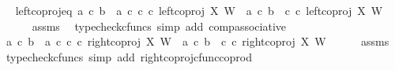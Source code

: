 \begin{isabellebody}
\ \isamarkupfalse%
\ left{\isacharunderscore}{\kern0pt}coproj{\isacharunderscore}{\kern0pt}eq{\isacharcolon}{\kern0pt}\ {\isachardoublequoteopen}{\isacharparenleft}{\kern0pt}{\isacharparenleft}{\kern0pt}a\ {\isasymcirc}\isactrlsub c\ b{\isacharparenright}{\kern0pt}\ {\isasymamalg}\ {\isacharparenleft}{\kern0pt}a\ {\isasymcirc}\isactrlsub c\ c{\isacharparenright}{\kern0pt}{\isacharparenright}{\kern0pt}\ {\isasymcirc}\isactrlsub c\ {\isacharparenleft}{\kern0pt}left{\isacharunderscore}{\kern0pt}coproj\ X\ W{\isacharparenright}{\kern0pt}\ {\isacharequal}{\kern0pt}\ {\isacharparenleft}{\kern0pt}a\ {\isasymcirc}\isactrlsub c\ {\isacharparenleft}{\kern0pt}b\ {\isasymamalg}\ c{\isacharparenright}{\kern0pt}{\isacharparenright}{\kern0pt}\ {\isasymcirc}\isactrlsub c\ {\isacharparenleft}{\kern0pt}left{\isacharunderscore}{\kern0pt}coproj\ X\ W{\isacharparenright}{\kern0pt}{\isachardoublequoteclose}\isanewline
\ \ \ \ \isamarkupfalse%
\ assms\ \isamarkupfalse%
\ {\isacharparenleft}{\kern0pt}typecheck{\isacharunderscore}{\kern0pt}cfuncs{\isacharcomma}{\kern0pt}\ simp\ add{\isacharcolon}{\kern0pt}\ comp{\isacharunderscore}{\kern0pt}associative{}{\isacharparenright}{\kern0pt}\isanewline
\ \ \isamarkupfalse%
\ {\isachardoublequoteopen}{\isacharparenleft}{\kern0pt}{\isacharparenleft}{\kern0pt}a\ {\isasymcirc}\isactrlsub c\ b{\isacharparenright}{\kern0pt}\ {\isasymamalg}\ {\isacharparenleft}{\kern0pt}a\ {\isasymcirc}\isactrlsub c\ c{\isacharparenright}{\kern0pt}{\isacharparenright}{\kern0pt}\ {\isasymcirc}\isactrlsub c\ {\isacharparenleft}{\kern0pt}right{\isacharunderscore}{\kern0pt}coproj\ X\ W{\isacharparenright}{\kern0pt}\ {\isacharequal}{\kern0pt}\ a\ {\isasymcirc}\isactrlsub c\ {\isacharparenleft}{\kern0pt}b\ {\isasymamalg}\ c{\isacharparenright}{\kern0pt}\ {\isasymcirc}\isactrlsub c\ {\isacharparenleft}{\kern0pt}right{\isacharunderscore}{\kern0pt}coproj\ X\ W{\isacharparenright}{\kern0pt}{\isachardoublequoteclose}\isanewline
\ \ \ \ \isamarkupfalse%
\ assms\ \isamarkupfalse%
\ {\isacharparenleft}{\kern0pt}typecheck{\isacharunderscore}{\kern0pt}cfuncs{\isacharcomma}{\kern0pt}\ simp\ add{\isacharcolon}{\kern0pt}\ right{\isacharunderscore}{\kern0pt}coproj{\isacharunderscore}{\kern0pt}cfunc{\isacharunderscore}{\kern0pt}coprod{\isacharparenright}{\kern0pt}\isanewline
\ \ \isamarkupfalse%
\ \isamarkupfalse%

\end{isabellebody}
